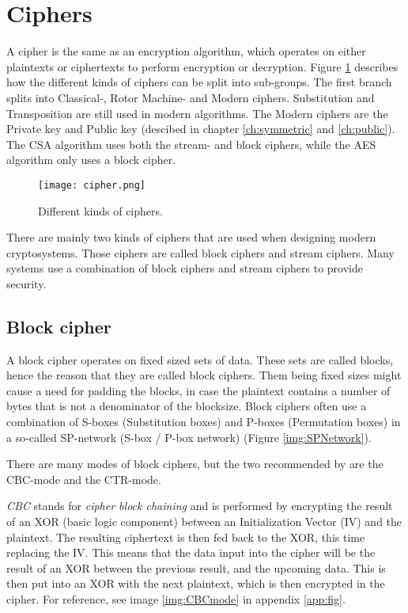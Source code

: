 \section{Ciphers}
A cipher is the same as an encryption algorithm, which operates on 
either plaintexts or ciphertexts to perform encryption or decryption. 
Figure \ref{img:ciphers} describes how the different kinds of ciphers 
can be split into sub-groups. The first branch splits into Classical-, 
Rotor Machine- and Modern ciphers. Substitution and Transposition are 
still used in modern algorithms. The Modern ciphers are the Private 
key and Public key (descibed in chapter \ref{ch:symmetric} and 
\ref{ch:public}). The CSA algorithm uses both the stream- and block 
ciphers, while the AES algorithm only uses a block cipher.

\begin{figure}
  \texttt{[image: cipher.png]}
  \caption{Different kinds of ciphers. \citep{CipherTax:2013}}
  \label{img:ciphers}
\end{figure}

There are mainly two kinds of ciphers that are used when designing 
modern cryptosystems. Those ciphers are called block ciphers and 
stream ciphers. Many systems use a combination of block ciphers and 
stream ciphers to provide security. 
\subsection{Block cipher}\label{sec:BlockCipher}
A block cipher operates on fixed sized sets of data. These sets are 
called blocks, hence the reason that they are called block ciphers. 
Them being fixed sizes might cause a need for padding the blocks, in 
case the plaintext contains a number of bytes that is not a denominator
of the blocksize. Block ciphers often use a combination of S-boxes 
(Substitution boxes) and P-boxes (Permutation boxes) in a so-called 
SP-network (S-box / P-box network) (Figure \ref{img:SPNetwork}).

There are many modes of block ciphers, but the two recommended by 
\citet{Schneier:2003} are the CBC-mode and the CTR-mode.

\emph{CBC} stands for \emph{cipher block chaining} and is performed by 
encrypting the result of an XOR (basic logic component) between 
an Initialization Vector (IV) and the plaintext. The resulting 
ciphertext is then fed back to the XOR, this time replacing the IV.
This means that the data input into the cipher will be the result of 
an XOR between the previous result, and the upcoming data. This is 
then put into an XOR with the next plaintext, which is then encrypted 
in the cipher. For reference, see image \ref{img:CBCmode} in 
appendix \ref{app:fig}. \citep[pp. 109--111]{Stinson:2006}

